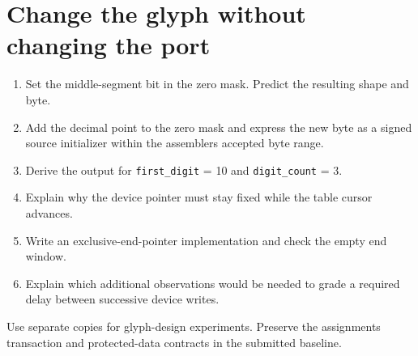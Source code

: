 \section{Change the glyph without changing the
  port}\label{005-seven-segment-counter-x-practice-change-the-glyph-without-changing-the-port}

\begin{enumerate}
  \def\labelenumi{\arabic{enumi}.}
  \tightlist
  \item
        Set the middle-segment bit in the zero mask. Predict the resulting
        shape and byte.
  \item
        Add the decimal point to the zero mask and express the new byte as a
        signed source initializer within the assembler\textquotesingle s
        accepted byte range.
  \item
        Derive the output for \texttt{first\_digit} = 10 and
        \texttt{digit\_count} = 3.
  \item
        Explain why the device pointer must stay fixed while the table cursor
        advances.
  \item
        Write an exclusive-end-pointer implementation and check the empty end
        window.
  \item
        Explain which additional observations would be needed to grade a
        required delay between successive device writes.
\end{enumerate}

Use separate copies for glyph-design experiments. Preserve the
assignment\textquotesingle s transaction and protected-data contracts in
the submitted baseline.

